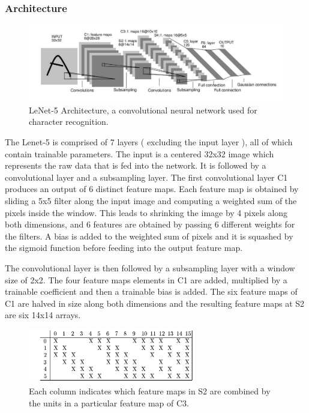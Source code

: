 \subsubsection{Architecture}

\begin{figure}[h!]
\centering
\includegraphics[width=1.0\textwidth]{Figures/lenet}
\decoRule
\caption[LeNet]{ LeNet-5 Architecture, a convolutional neural network used for character recognition. \cite{lenet}}
\label{fig:Lenet-5}
\end{figure}

The Lenet-5 is comprised of 7 layers ( excluding the input layer ), all of which contain trainable parameters. The input is a centered 32x32 image which represents the raw data that is fed into the network. It is followed by a convolutional layer and a subsampling layer. The first convolutional layer C1 produces an output of 6 distinct feature maps. Each feature map is obtained by sliding a 5x5 filter along the input image and computing a weighted sum of the pixels inside the window. This leads to shrinking the image by 4 pixels along both dimensions, and 6 features are obtained by passing 6 different weights for the filters. A bias is added to the weighted sum of pixels and it is squashed by the sigmoid function before feeding into the output feature map. 

The convolutional layer is then followed by a subsampling layer with a window size of 2x2. The four feature maps elements in C1 are added, multiplied by a trainable coefficient and then a trainable bias is added. The six feature maps of C1 are halved in size along both dimensions and the resulting feature maps at S2 are six 14x14 arrays. 

\begin{figure}[h!]
\centering
\includegraphics[width=0.65\textwidth]{Figures/connections}
\caption[Connections]{ Each column indicates which feature maps in S2 are combined by the units in a particular feature map of C3. \cite{lenet}}
\label{fig:Lenet Connections}
\end{figure}

